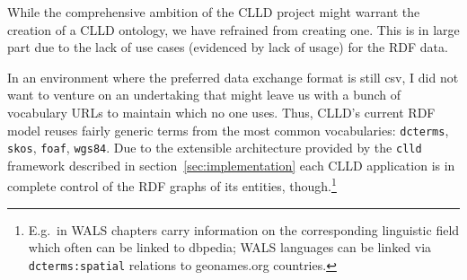 \documentclass[a4paper,10pt]{article}
\begin{document}
\label{sec:vocab}

While the comprehensive ambition of the CLLD project might warrant the creation of a CLLD
ontology, we have refrained from creating one. This is in large part due to the lack of use
cases (evidenced by lack of usage) for the RDF data.

In an environment where the preferred data exchange format is still csv, I did not want to
venture on an undertaking that might leave us with a bunch of vocabulary URLs to maintain
which no one uses.
Thus, CLLD's current RDF model reuses fairly generic terms from the most common
vocabularies: \texttt{dcterms}, \texttt{skos}, \texttt{foaf}, \texttt{wgs84}.
Due to the extensible architecture provided by the \texttt{clld} framework described in
section~\ref{sec:implementation} each CLLD application is in complete control of the RDF
graphs of its entities, though.\footnote{E.g.~in WALS chapters carry information on the
corresponding linguistic field which often can be linked to dbpedia; WALS languages can be
linked via \texttt{dcterms:spatial} relations to geonames.org countries.}








\end{document}
